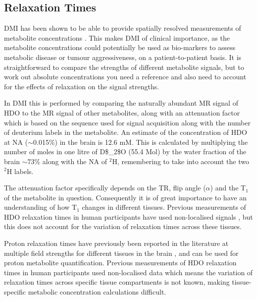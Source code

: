 \subsection{Relaxation Times}

\Ac{DMI} has been shown to be able to provide spatially resolved measurements of metabolite concentrations \cite{Kreis2020MeasuringMRI,Lu2017QuantitativeSpectroscopy}. This makes \ac{DMI} of clinical importance, as the metabolite concentrations could potentially be used as bio-markers to assess metabolic disease or tumour aggressiveness, on a patient-to-patient basis. It is straightforward to compare the strengths of different metabolite signals, but to work out absolute concentrations you need a reference and also need to account for the effects of relaxation on the signal strengths. 

In \ac{DMI} this is performed by comparing the naturally abundant MR signal of \ac{HDO} to the MR signal of other metabolites, along with an attenuation factor which is based on the sequence used for signal acquisition along with the number of deuterium labels in the metabolite. An estimate of the concentration of \ac{HDO} at \ac{NA} ($\sim$0.015\%) in the brain is 12.6 mM. This is calculated by multiplying the number of moles in one litre of \ac{D$_2$O} (55.4 Mol) by the water fraction of the brain $\sim$73\% along with the \ac{NA} of $^2$H, remembering to take into account the two $^2$H labels.

The attenuation factor specifically depends on the \ac{TR}, flip angle ($\alpha$) and the T$_1$ of the metabolite in question. Consequently it is of great importance to have an understanding of how T$_1$ changes in different tissues. Previous measurements of \ac{HDO} relaxation times in human participants have used non-localised signals \cite{DeFeyter2018DeuteriumVivo,DeFeyter2021DeuteriumFuture,Ruhm2021DeuteriumResolution}, but this does not account for the variation of relaxation times across these tissues.

Proton relaxation times have previously been reported in the literature at multiple field strengths for different tissues in the brain \cite{Wright2008WaterOptimization}, and can be used for proton metabolite quantification. Previous measurements of \ac{HDO} relaxation times in human participants used non-localised data \cite{DeFeyter2018DeuteriumVivo, Ruhm2022Dynamic9.4T, Gursan2022ResidualMuscle} which means the variation of relaxation times across specific tissue compartments is not known, making tissue-specific metabolic concentration calculations difficult.  


